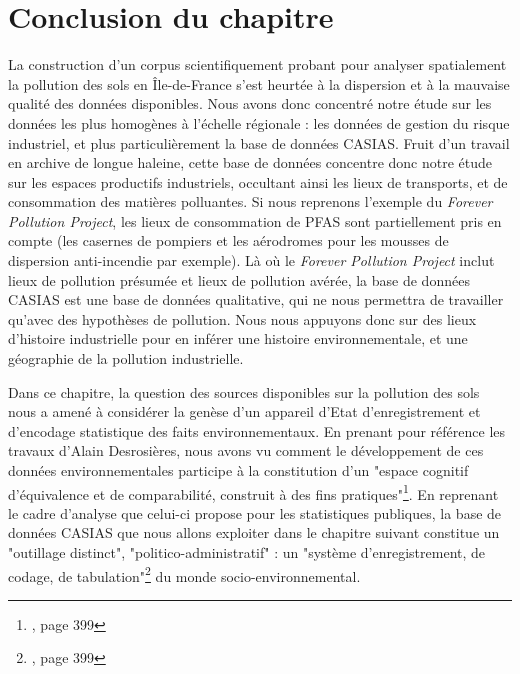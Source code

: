 \documentclass[a4paper,twoside,12pt]{book}
\begin{document}
\section{Conclusion du chapitre}

La construction d'un corpus scientifiquement probant pour analyser spatialement la pollution des sols en Île-de-France s'est heurtée à la dispersion et à la mauvaise qualité des données disponibles. Nous avons donc concentré notre étude sur les données les plus homogènes à l'échelle régionale : les données de gestion du risque industriel, et plus particulièrement la base de données CASIAS. Fruit d'un travail en archive de longue haleine, cette base de données concentre donc notre étude sur les espaces productifs industriels, occultant ainsi les lieux de transports, et de consommation des matières polluantes. Si nous reprenons l'exemple du \textit{Forever Pollution Project}, les lieux de consommation de PFAS sont partiellement pris en compte (les casernes de pompiers et les aérodromes pour les mousses de dispersion anti-incendie par exemple). Là où le \textit{Forever Pollution Project} inclut lieux de pollution présumée et lieux de pollution avérée, la base de données CASIAS est une base de données qualitative, qui ne nous permettra de travailler qu'avec des hypothèses de pollution. Nous nous appuyons donc sur des lieux d'histoire industrielle pour en inférer une histoire environnementale, et une géographie de la pollution industrielle. 

Dans ce chapitre, la question des sources disponibles sur la pollution des sols nous a amené à considérer la genèse d'un appareil d'Etat d'enregistrement et d'encodage statistique des faits environnementaux. En prenant pour référence les travaux d'Alain Desrosières, nous avons vu comment le développement de ces données environnementales participe à la constitution d'un "espace cognitif d'équivalence et de comparabilité, construit à des fins pratiques"\footnote{\cite{desrosieres_politique_2010}, page 399}. En reprenant le cadre d'analyse que celui-ci propose pour les statistiques publiques, la base de données CASIAS que nous allons exploiter dans le chapitre suivant constitue un "outillage distinct", "politico-administratif" : un "système d'enregistrement, de codage, de tabulation"\footnote{\cite{desrosieres_politique_2010}, page 399} du monde socio-environnemental. %
\end{document}
